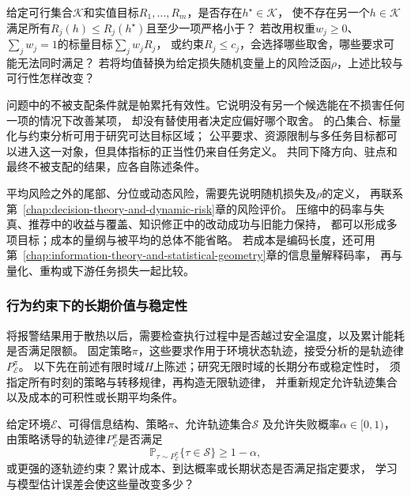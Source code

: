 \begin{mathproblem}
  \label{question:future-multiple-objectives}
  给定可行集合$\mathcal K$和实值目标$R_1,\ldots,R_m$，是否存在$h^\star\in\mathcal K$，
  使不存在另一个$h\in\mathcal K$满足所有$R_j(h)\leq R_j(h^\star)$且至少一项严格小于？
  若改用权重$w_j\geq0$、$\sum_jw_j=1$的标量目标$\sum_jw_jR_j$，
  或约束$R_j\leq c_j$，会选择哪些取舍，哪些要求可能无法同时满足？
  若将均值替换为给定损失随机变量上的风险泛函$\rho$，上述比较与可行性怎样改变？
\end{mathproblem}

问题中的不被支配条件就是帕累托有效性。它说明没有另一个候选能在不损害任何一项的情况下改善某项，
却没有替使用者决定应偏好哪个取舍。
的凸集合、标量化与约束分析可用于研究可达目标区域；
公平要求、资源限制与多任务目标都可以进入这一对象，但具体指标的正当性仍来自任务定义。
共同下降方向、驻点和最终不被支配的结果，应各自陈述条件。

平均风险之外的尾部、分位或动态风险，需要先说明随机损失及$\rho$的定义，
再联系第~\ref{chap:decision-theory-and-dynamic-risk}章的风险评价。
压缩中的码率与失真、推荐中的收益与覆盖、知识修正中的改动成功与旧能力保持，
都可以形成多项目标；成本的量纲与被平均的总体不能省略。
若成本是编码长度，还可用第~\ref{chap:information-theory-and-statistical-geometry}章的信息量解释码率，
再与量化、重构或下游任务损失一起比较。

\subsubsection{行为约束下的长期价值与稳定性}
\label{sec:future-analysis-closed-loop}

将报警结果用于散热以后，需要检查执行过程中是否越过安全温度，以及累计能耗是否满足限额。
固定策略$\pi$，这些要求作用于环境状态轨迹，接受分析的是轨迹律$P_{\mathcal E}^{\pi}$。
以下先在前述有限时域$H$上陈述；研究无限时域的长期分布或稳定性时，
须指定所有时刻的策略与转移规律，再构造无限轨迹律，
并重新规定允许轨迹集合以及成本的可积性或长期平均条件。

\begin{mathproblem}[闭环轨迹能否满足长期要求]
  \label{question:future-closed-loop}
  给定环境$\mathcal E$、可得信息结构、策略$\pi$、允许轨迹集合$\mathcal S$
  及允许失败概率$\alpha\in[0,1)$，
  由策略诱导的轨迹律$P_{\mathcal E}^{\pi}$是否满足
  \[
    \mathbb P_{\tau\sim P_{\mathcal E}^{\pi}}\{\tau\in\mathcal S\}
    \geq1-\alpha,
  \]
  或更强的逐轨迹约束？累计成本、到达概率或长期状态是否满足指定要求，
  学习与模型估计误差会使这些量改变多少？
\end{mathproblem}

